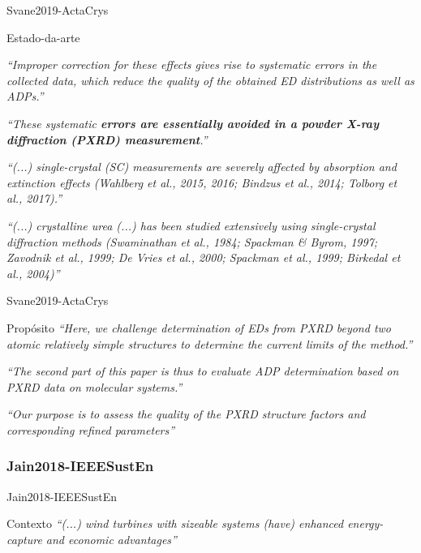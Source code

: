 \begin{frame}{Svane2019-ActaCrys} 
\begin{block}{Estado-da-arte}
\scriptsize{
\emph{``Improper correction for these effects gives rise to systematic errors in the collected data, which reduce the quality of the obtained ED distributions as well as ADPs.''}

\emph{``These systematic \textbf{errors are essentially avoided in a powder X-ray diffraction (PXRD) measurement}.''}

\emph{``(...) single-crystal (SC) measurements are severely affected by absorption and extinction effects (Wahlberg et al., 2015, 2016; Bindzus et al., 2014; Tolborg et al., 2017).''}

\emph{``(...) crystalline urea (...) has been studied extensively using single-crystal diffraction methods (Swaminathan et al., 1984; Spackman \& Byrom, 1997; Zavodnik et al., 1999; De Vries et al., 2000; Spackman et al., 1999; Birkedal et al., 2004)''}
}
\end{block}
\end{frame}

\begin{frame}{Svane2019-ActaCrys} 
\begin{block}{Propósito}
\emph{``Here, we challenge determination of EDs from PXRD beyond two atomic relatively simple structures to determine the current limits of the method.''}

\emph{``The second part of this paper is thus to evaluate ADP determination based on PXRD data on molecular systems.''}

\emph{``Our purpose is to assess the quality of the PXRD structure factors and corresponding refined parameters''}
\end{block}
\end{frame}

\subsubsection*{Jain2018-IEEESustEn}

\begin{frame}{Jain2018-IEEESustEn} 
\begin{block}{Contexto}
\emph{``(...) wind turbines with sizeable systems (have) enhanced energy-capture and economic advantages''}
\end{block}
\end{frame}

